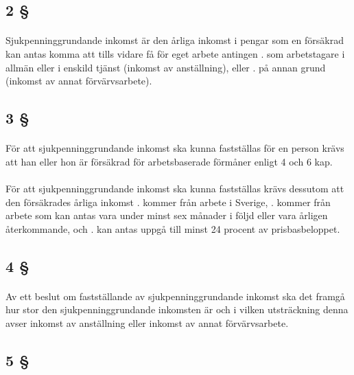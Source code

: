 \documentclass[a4paper,notitlepage,openany,10pt]{book}
\begin{document}
\subsection*{2 §}
\paragraph*{}
Sjukpenninggrundande inkomst är den årliga inkomst i pengar som en försäkrad kan antas komma att tills vidare få för eget arbete antingen
. som arbetstagare i allmän eller i enskild tjänst (inkomst av anställning), eller
. på annan grund (inkomst av annat förvärvsarbete).
\subsection*{3 §}
\paragraph*{}
För att sjukpenninggrundande inkomst ska kunna fastställas för en person krävs att han eller hon är försäkrad för arbetsbaserade förmåner enligt 4 och 6 kap.
\paragraph*{}
För att sjukpenninggrundande inkomst ska kunna fastställas krävs dessutom att den försäkrades årliga inkomst
. kommer från arbete i Sverige,
. kommer från arbete som kan antas vara under minst sex månader i följd eller vara årligen återkommande, och
. kan antas uppgå till minst 24 procent av prisbasbeloppet.
\subsection*{4 §}
\paragraph*{}
Av ett beslut om fastställande av sjukpenninggrundande inkomst ska det framgå hur stor den sjukpenninggrundande inkomsten är och i vilken utsträckning denna avser inkomst av anställning eller inkomst av annat förvärvsarbete.
\subsection*{5 §}
\end{document}
